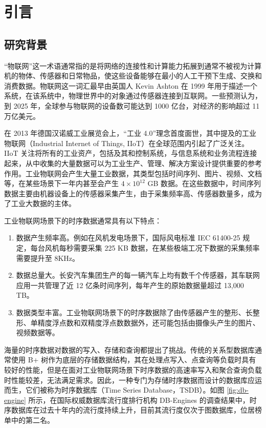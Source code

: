 
\chapter{引言}
\section{研究背景\label{sec:chap1-sec1}}
“物联网”这一术语通常指的是将网络的连接性和计算能力拓展到通常不被视为计算机的物体、传感器和日常物品，使这些设备能够在最小的人工干预下生成、交换和消费数据。物联网这一词汇最早由英国人 Kevin Ashton 在 1999 年用于描述一个系统，在该系统中，物理世界中的对象通过传感器连接到互联网\cite{li2015internet}。一些预测认为，到 2025 年，全球参与物联网的设备数可能达到 1000 亿台，对经济的影响超过 11 万亿美元\cite{rose2015internet}。

在 2013 年德国汉诺威工业展览会上，“工业 4.0”理念首度面世\cite{ghobakhloo2020industry}，其中提及的工业物联网（Industrial Internet of Things, IIoT）在全球范围内引起了广泛关注。IIoT 关注将所有的工业资产，包括及其和控制系统，与信息系统和业务流程连接起来，从中收集的大量数据可以为工业生产、管理、解决方案设计提供重要的参考作用\cite{sisinni2018industrial}。工业物联网会产生大量工业数据，其类型包括时间序列、图片、视频、文档等，在某些场景下一年内甚至会产生 $4\times 10^{12}$ GB 数据\cite{ge2012riseofindustrial}。在这些数据中，时间序列数据主要由机器设备上的传感器采集产生，由于采集频率高、传感器数量多，成为了工业大数据的主体\cite{di2019industrial}。

工业物联网场景下的时序数据通常具有以下特点：
\begin{enumerate}
  \item 数据产生频率高。例如在风机发电场景下，国际风电标准 IEC 61400-25 规定，每台风机每秒需要采集 225 KB 数据，在某些极端工况下数据的采集频率需要提升至 8KHz\cite{李天安2020apache}。
  \item 数据总量大。长安汽车集团生产的每一辆汽车上均有数千个传感器，其车联网应用一共管理了近 12 亿条时间序列，每年产生的原始数据量超过 13,000 TB。
  \item 数据类型丰富。工业物联网场景下的时序数据除了由传感器产生的整形、长整形、单精度浮点数和双精度浮点数数据外，还可能包括由摄像头产生的图片、视频数据等。
\end{enumerate}

海量的时序数据对数据的写入、存储和查询都提出了挑战。传统的关系型数据库通常使用 B+ 树作为底层的存储数据结构，其在处理点写入、点查询等负载时具有较好的性能，但是在面对工业物联网场景下时序数据的高速率写入和聚合查询负载时性能较差，无法满足需求\cite{jensen2017time}。因此，一种专门为存储时序数据而设计的数据库应运而生，它们被称为时序数据库（Time Series Database，TSDB）。如图 \ref{fig:db-engine} 所示，在国际权威数据库流行度排行机构 DB-Engines 的调查结果中，时序数据库在过去十年内的流行度持续上升，目前其流行度仅次于图数据库，位居榜单中的第二名。

